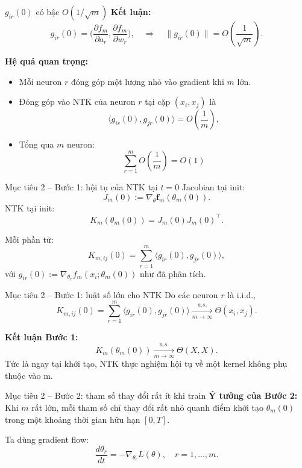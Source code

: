 \begin{frame}{$g_{ir}(0)$ có bậc $O(1/\sqrt{m})$}
  \textbf{Kết luận:}
  \[
    g_{ir}(0)
    =
    \Big(
      \frac{\partial f_m}{\partial a_r},
      \frac{\partial f_m}{\partial w_r}
    \Big),
    \quad
    \Rightarrow\quad
    \|g_{ir}(0)\|
    = O\!\left(\frac{1}{\sqrt{m}}\right).
  \]

  \textbf{Hệ quả quan trọng:}
  \begin{itemize}
    \item Mỗi neuron $r$ đóng góp một lượng nhỏ vào gradient khi $m$ lớn.
    \item Đóng góp vào NTK của neuron $r$ tại cặp $(x_i,x_j)$ là
          \[
            \big\langle g_{ir}(0), g_{jr}(0) \big\rangle
            = O\!\left(\frac{1}{m}\right),
          \]
    \item Tổng qua $m$ neuron:
          \[
            \sum_{r=1}^m O\!\left(\frac{1}{m}\right)
            = O(1)
          \]
  \end{itemize}
\end{frame}

\begin{frame}{Mục tiêu 2 – Bước 1: hội tụ của NTK tại $t=0$}
  Jacobian tại init:
  \[
    J_m(0) := \nabla_\theta \mathbf f_m(\theta_m(0)).
  \]
NTK tại init:
  \[
    K_m(\theta_m(0)) = J_m(0)J_m(0)^\top.
  \]

  Mỗi phần tử:
  \[
    K_{m,ij}(0)
      = \sum_{r=1}^m \big\langle g_{ir}(0), g_{jr}(0)\big\rangle,
  \]
  với $g_{ir}(0) := \nabla_{\theta_r} f_m(x_i;\theta_m(0))$ như đã phân tích.
\end{frame}

\begin{frame}{Mục tiêu 2 – Bước 1: luật số lớn cho NTK}
  Do các neuron $r$ là i.i.d.,
  \[
    K_{m,ij}(0)
    = \sum_{r=1}^m \big\langle g_{ir}(0),g_{jr}(0)\big\rangle
    \xrightarrow[m\to\infty]{a.s.} \Theta(x_i,x_j).
  \]

  \textbf{Kết luận Bước 1:}
  \[
    K_m(\theta_m(0)) \xrightarrow[m\to\infty]{a.s.} \Theta(X,X).
  \]
  Tức là ngay tại khởi tạo, NTK thực nghiệm hội tụ về một kernel không phụ thuộc vào m.
\end{frame}

\begin{frame}{Mục tiêu 2 – Bước 2: tham số thay đổi rất ít khi train}
  \textbf{Ý tưởng của Bước 2:}  
  Khi $m$ rất lớn, mỗi tham số chỉ thay đổi rất nhỏ quanh điểm khởi tạo
  $\theta_m(0)$ trong một khoảng thời gian hữu hạn $[0,T]$.

  \vspace{0.2cm}
  Ta dùng gradient flow:
  \[
    \frac{d\theta_r}{dt}
    = -\nabla_{\theta_r}L(\theta),
    \quad r = 1,\dots,m.
  \]
\end{frame}

